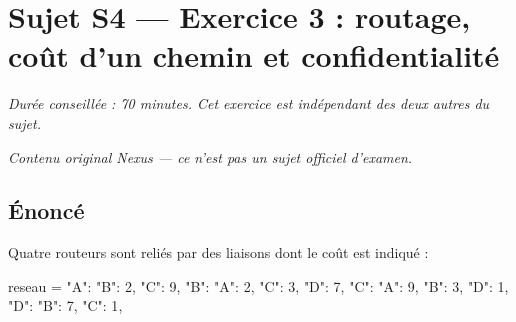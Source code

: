 \section*{Sujet S4 --- Exercice 3 : routage, coût d'un chemin et confidentialité}

\textit{Durée conseillée : 70 minutes. Cet exercice est indépendant des deux
autres du sujet.}

\medskip
\textit{Contenu original Nexus --- ce n'est pas un sujet officiel d'examen.}

\subsection*{Énoncé}

Quatre routeurs sont reliés par des liaisons dont le coût est indiqué :

\begin{python}
reseau = {
    "A": {"B": 2, "C": 9},
    "B": {"A": 2, "C": 3, "D": 7},
    "C": {"A": 9, "B": 3, "D": 1},
    "D": {"B": 7, "C": 1},
}
\end{python}

